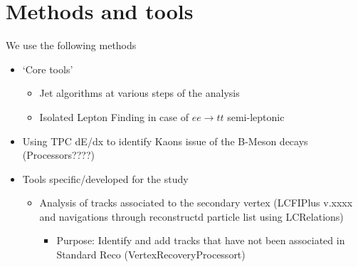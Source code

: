 \documentclass[preprint]{elsarticle}
\newcommand{\ecal}{Si-W ECAL}
\begin{document}

\section{Methods and tools}

We use the following methods
\begin{itemize}

\item `Core tools'
\begin{itemize}
\item Jet algorithms at various steps of the analysis 
\item Isolated Lepton Finding in case of $ee\rightarrow tt$ semi-leptonic
\end{itemize}
\item Using TPC dE/dx to identify Kaons issue of the B-Meson decays (Processors????)

\item Tools specific/developed for the study
\begin{itemize}
\item Analysis of tracks associated to the secondary vertex (LCFIPlus v.xxxx and navigations through reconstructd particle list using LCRelations)
\begin{itemize}
\item Purpose: Identify and add tracks that have not been associated in Standard Reco (VertexRecoveryProcessort) 
\end{itemize}
\end{itemize}


\end{itemize}
\end{document}
